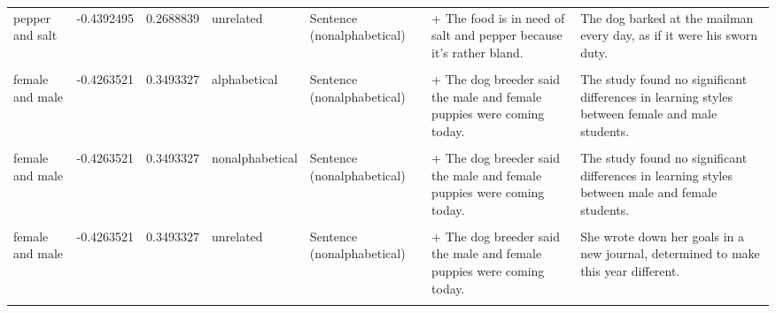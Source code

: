 \documentclass[
  12pt,
]{scrartcl}
\begin{document}
\begin{landscape}
\begin{longtable}{lrrllll}
pepper and salt & -0.4392495 & 0.2688839 & unrelated & Sentence (nonalphabetical) & + The food is in need of salt and pepper because it's rather bland. & The dog barked at the mailman every day, as if it were his sworn duty.\\
\addlinespace
\cellcolor{gray!6}{female and male} & \cellcolor{gray!6}{-0.4263521} & \cellcolor{gray!6}{0.3493327} & \cellcolor{gray!6}{alphabetical} & \cellcolor{gray!6}{Sentence (alphabetical)} & \cellcolor{gray!6}{+ The dog breeder said the female and male puppies are coming today.} & \cellcolor{gray!6}{The study found no significant differences in learning styles between female and male students.}\\
female and male & -0.4263521 & 0.3493327 & alphabetical & Sentence (nonalphabetical) & + The dog breeder said the male and female puppies were coming today. & The study found no significant differences in learning styles between female and male students.\\
\cellcolor{gray!6}{female and male} & \cellcolor{gray!6}{-0.4263521} & \cellcolor{gray!6}{0.3493327} & \cellcolor{gray!6}{nonalphabetical} & \cellcolor{gray!6}{Sentence (alphabetical)} & \cellcolor{gray!6}{+ The dog breeder said the female and male puppies are coming today.} & \cellcolor{gray!6}{The study found no significant differences in learning styles between male and female students.}\\
female and male & -0.4263521 & 0.3493327 & nonalphabetical & Sentence (nonalphabetical) & + The dog breeder said the male and female puppies were coming today. & The study found no significant differences in learning styles between male and female students.\\
\cellcolor{gray!6}{female and male} & \cellcolor{gray!6}{-0.4263521} & \cellcolor{gray!6}{0.3493327} & \cellcolor{gray!6}{unrelated} & \cellcolor{gray!6}{Sentence (alphabetical)} & \cellcolor{gray!6}{+ The dog breeder said the female and male puppies are coming today.} & \cellcolor{gray!6}{She wrote down her goals in a new journal, determined to make this year different.}\\
\addlinespace
female and male & -0.4263521 & 0.3493327 & unrelated & Sentence (nonalphabetical) & + The dog breeder said the male and female puppies were coming today. & She wrote down her goals in a new journal, determined to make this year different.\\
\cellcolor{gray!6}{brothers and sisters} & \cellcolor{gray!6}{0.4142403} & \cellcolor{gray!6}{0.6388390} & \cellcolor{gray!6}{alphabetical} & \cellcolor{gray!6}{Sentence (alphabetical)} & \cellcolor{gray!6}{+ Andrew shared with his brothers and sisters, so he was excited to have a roomate.} & \cellcolor{gray!6}{I always love seeing my brothers and sisters when I go home for the holidays.}\\

\end{longtable}
\end{landscape}
\end{document}
